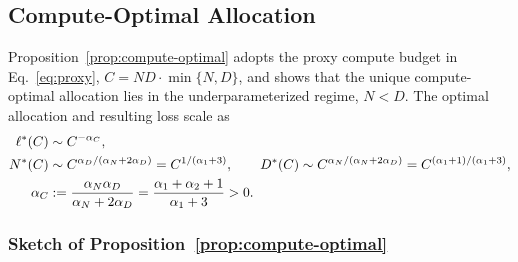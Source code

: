 \documentclass[11pt]{article}
\theoremstyle{plain}
\theoremstyle{definition}
\theoremstyle{remark}
\begin{document}
\subsection{Compute-Optimal Allocation}
Proposition~\ref{prop:compute-optimal} adopts the proxy compute budget in Eq.~\eqref{eq:proxy},
$C = ND \cdot \min\{N,D\}$, and shows that the unique compute-optimal allocation lies in the underparameterized regime, $N<D$. The optimal allocation and resulting loss scale as
\begin{equation}
\begin{split}
\ell^*(C) &\sim C^{-\alpha_C}, \\
N^*(C) &\sim C^{\alpha_D/(\alpha_N+2\alpha_D)}
= C^{1/(\alpha_1+3)}, \qquad
D^*(C) \sim C^{\alpha_N/(\alpha_N+2\alpha_D)}
= C^{(\alpha_1+1)/(\alpha_1+3)},\\
\alpha_C &:= \frac{\alpha_N\alpha_D}{\alpha_N+2\alpha_D}
= \frac{\alpha_1+\alpha_2+1}{\alpha_1+3} > 0 .
\end{split}
\label{eq:compute-opt-ND-app}
\raisetag{4ex}
\end{equation}

\subsubsection{Sketch of Proposition~\ref{prop:compute-optimal}}
\label{app:optimal-derivation}
\end{document}

